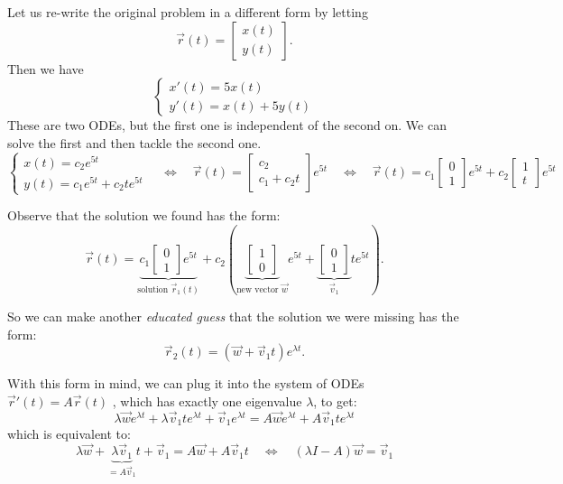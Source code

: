 \begin{example}
Let us re-write the original problem in a different form by letting 
$$
\vec{r}(t) = \begin{bmatrix} x(t) \\ y(t)\end{bmatrix}.
$$
Then we have
$$
\begin{cases}
x'(t) = 5 x(t) \\
y'(t) = x(t) +5 y(t)	
\end{cases}
$$
These are two ODEs, but the first one is independent of the second on. We can solve the first and then tackle the second one.
$$
\begin{cases}
	x(t) = c_2 e^{5t} \\
	y(t) = 	c_1 e^{5t} + c_2 t e^{5t} 
\end{cases}
\quad \Leftrightarrow \quad
	\vec{r}(t) = \begin{bmatrix}
		c_2 \\ c_1 + c_2 t
	\end{bmatrix} e^{5t}
\quad \Leftrightarrow \quad
	\vec{r}(t) = c_1 \begin{bmatrix} 0 \\ 1 \end{bmatrix} e^{5t} + c_2
	\begin{bmatrix}	1 \\ t
	\end{bmatrix} e^{5t}
$$
\end{example}

Observe that the solution we found has the form:
$$
	\vec{r}(t) = \underbrace{c_1 \begin{bmatrix} 0 \\ 1 \end{bmatrix} e^{5t}}_{\text{solution } \vec{r}_1(t)} + c_2 \left( 
	\underbrace{\begin{bmatrix}	1 \\ 0 \end{bmatrix}}_{\text{new vector } \vec{w}} e^{5t} + \underbrace{\begin{bmatrix} 0  \\ 1 
	\end{bmatrix}}_{\vec{v}_1} t e^{5t}\right).
$$

So we can make another \emph{educated guess} that the solution we were missing has the form:
$$
\vec{r}_2(t) = \left(\vec{w} + \vec{v}_1 t\right) e^{\lambda t}.
$$

With this form in mind, we can plug it into the system of ODEs \quad $\vec{r}'(t) = A \vec{r}(t)$ \quad, which has exactly one eigenvalue $\lambda$, to get:
$$
\lambda \vec{w}e^{\lambda t} + \lambda \vec{v}_1 t e^{\lambda t} + \vec{v}_1 e^{\lambda t}
= A \vec{w} e^{\lambda t} + A \vec{v}_1 t  e^{\lambda t}
$$
which is equivalent to:
$$
\lambda \vec{w} + \underbrace{\lambda \vec{v}_1}_{=A \vec{v}_1} t  + \vec{v}_1
= A \vec{w}  + A \vec{v}_1 t 
	\quad \Leftrightarrow \quad
	\left( \lambda I - A \right ) \vec{w} = \vec{v}_1
$$

